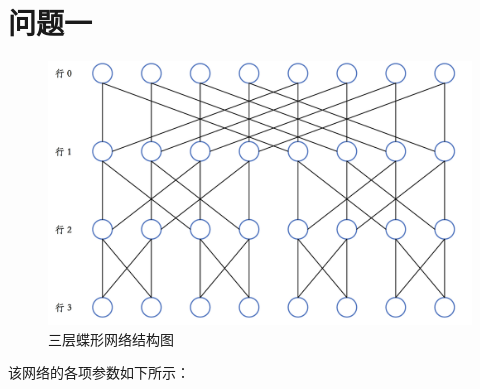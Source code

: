 \documentclass[12pt]{article}
\begin{document}
\section{问题一}
	\begin{figure}[h]
		\centering
		\includegraphics[width=1.0\textwidth]{network.png}
		\caption{三层蝶形网络结构图}
	\end{figure}
	该网络的各项参数如下所示：
\end{document}
